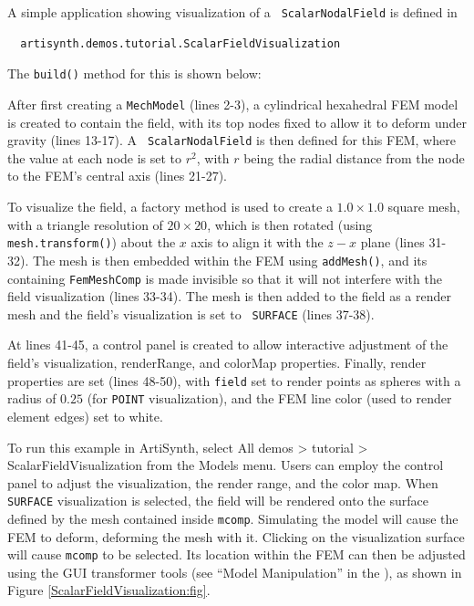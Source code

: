 A simple application showing visualization of a {\tt
ScalarNodalField} is defined in
%
\begin{verbatim}
  artisynth.demos.tutorial.ScalarFieldVisualization
\end{verbatim}
%
The {\tt build()} method for this is shown below:
\lstset{numbers=left}
\iflatexml

\else

\fi
\lstset{numbers=none}
%
After first creating a {\tt MechModel} (lines 2-3), a cylindrical
hexahedral FEM model is created to contain the field, with its top
nodes fixed to allow it to deform under gravity (lines 13-17). A {\tt
ScalarNodalField} is then defined for this FEM, where the value at
each node is set to $r^2$, with $r$ being the radial distance from the
node to the FEM's central axis (lines 21-27).

To visualize the field, a factory method is used to create a
$1.0 \times 1.0$ square mesh, with a triangle resolution of $20 \times
20$, which is then rotated (using {\tt mesh.transform()}) about the
$x$ axis to align it with the $z-x$ plane (lines 31-32). The mesh is
then embedded within the FEM using {\tt addMesh()}, and its containing
{\tt FemMeshComp} is made invisible so that it will not interfere with
the field visualization (lines 33-34). The mesh is then added to the
field as a render mesh and the field's visualization is set to {\tt
SURFACE} (lines 37-38).

At lines 41-45, a control panel is created to allow interactive
adjustment of the field's {\sf visualization}, {\sf renderRange}, and
{\sf colorMap} properties. Finally, render properties are set (lines
48-50), with {\tt field} set to render points as spheres with a radius
of $0.25$ (for {\tt POINT} visualization), and the FEM line color
(used to render element edges) set to white.

To run this example in ArtiSynth, select {\sf All demos > tutorial >
ScalarFieldVisualization} from the {\sf Models} menu. Users can employ
the control panel to adjust the visualization, the render range, and
the color map. When {\tt SURFACE} visualization is selected, the field
will be rendered onto the surface defined by the mesh contained inside
{\tt mcomp}. Simulating the model will cause the FEM to deform,
deforming the mesh with it. Clicking on the visualization surface will
cause {\tt mcomp} to be selected. Its location within the FEM can then
be adjusted using the GUI transformer tools (see ``Model
Manipulation'' in the ), as shown in
Figure \ref{ScalarFieldVisualization:fig}.

